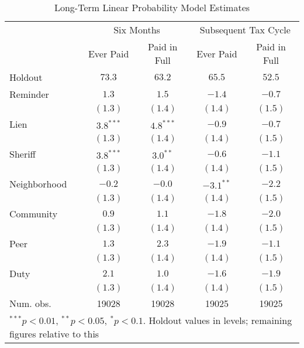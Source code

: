 \documentclass[12pt]{article}
\begin{document}
\begin{table}[htb]
\caption{Long-Term Linear Probability Model Estimates}
\label{ltmpme}
\begin{center}
\begin{tabular}{l c c c c }
\hline
 & \multicolumn{2}{c}{Six Months} & \multicolumn{2}{c}{Subsequent Tax Cycle} \\
 & Ever Paid & Paid in Full & Ever Paid & Paid in Full \\
Holdout      & $73.3$ & $63.2$ & $65.5$ & $52.5$ \\
\hline
Reminder     & $1.3$        & $1.5$        & $-1.4$       & $-0.7$       \\
             & $(1.3)$      & $(1.4)$      & $(1.4)$      & $(1.5)$      \\
Lien         & $3.8^{***}$  & $4.8^{***}$  & $-0.9$       & $-0.7$       \\
             & $(1.3)$      & $(1.4)$      & $(1.4)$      & $(1.5)$      \\
Sheriff      & $3.8^{***}$  & $3.0^{**}$   & $-0.6$       & $-1.1$       \\
             & $(1.3)$      & $(1.4)$      & $(1.4)$      & $(1.5)$      \\
Neighborhood & $-0.2$       & $-0.0$       & $-3.1^{**}$  & $-2.2$       \\
             & $(1.3)$      & $(1.4)$      & $(1.4)$      & $(1.5)$      \\
Community    & $0.9$        & $1.1$        & $-1.8$       & $-2.0$       \\
             & $(1.3)$      & $(1.4)$      & $(1.4)$      & $(1.5)$      \\
Peer         & $1.3$        & $2.3$        & $-1.9$       & $-1.1$       \\
             & $(1.3)$      & $(1.4)$      & $(1.4)$      & $(1.5)$      \\
Duty         & $2.1$        & $1.0$        & $-1.6$       & $-1.9$       \\
             & $(1.3)$      & $(1.4)$      & $(1.4)$      & $(1.5)$      \\
\hline
Num. obs.    & 19028        & 19028        & 19025        & 19025        \\
\hline
\multicolumn{5}{l}{\scriptsize{$^{***}p<0.01$, $^{**}p<0.05$, $^*p<0.1$. Holdout values in levels; remaining figures relative to this}}
\end{tabular}
\label{lg_pc_lin}
\end{center}
\end{table}
\end{document}
